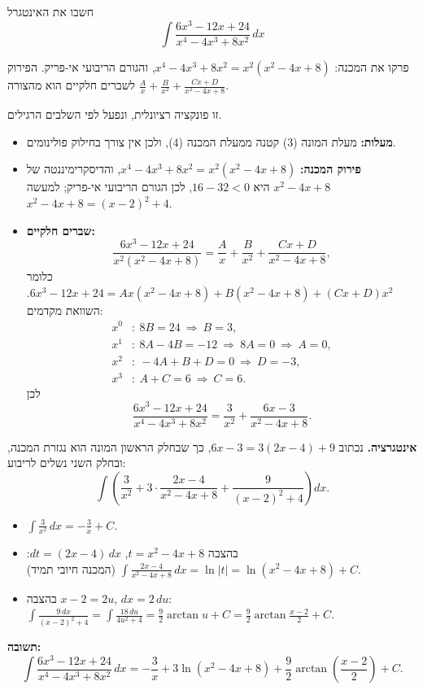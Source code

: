 
\begin{question}
חשבו את האינטגרל
\[ \int \frac{6x^3 - 12x + 24}{x^4 - 4x^3 + 8x^2}\,dx \]
\end{question}

\begin{hint}
פרקו את המכנה: $x^4 - 4x^3 + 8x^2 = x^2(x^2 - 4x + 8)$, והגורם הריבועי אי-פריק. הפירוק לשברים חלקיים הוא מהצורה $\frac{A}{x} + \frac{B}{x^2} + \frac{Cx + D}{x^2 - 4x + 8}$.
\end{hint}

\begin{solution}
זו פונקציה רציונלית, ונפעל לפי השלבים הרגילים.
\begin{itemize}
  \item \textbf{מעלות:} מעלת המונה ($3$) קטנה ממעלת המכנה ($4$), ולכן אין צורך בחילוק פולינומים.
  \item \textbf{פירוק המכנה:} $x^4 - 4x^3 + 8x^2 = x^2(x^2 - 4x + 8)$, והדיסקרימיננטה של $x^2 - 4x + 8$ היא $16 - 32 < 0$, לכן הגורם הריבועי אי-פריק; למעשה $x^2 - 4x + 8 = (x - 2)^2 + 4$.
  \item \textbf{שברים חלקיים:}
  \[ \frac{6x^3 - 12x + 24}{x^2(x^2 - 4x + 8)} = \frac{A}{x} + \frac{B}{x^2} + \frac{Cx + D}{x^2 - 4x + 8}, \]
  כלומר $6x^3 - 12x + 24 = Ax(x^2 - 4x + 8) + B(x^2 - 4x + 8) + (Cx + D)x^2$. השוואת מקדמים:
  \begin{align*}
    x^0 &: \ 8B = 24 \ \Rightarrow\ B = 3, \\
    x^1 &: \ 8A - 4B = -12 \ \Rightarrow\ 8A = 0 \ \Rightarrow\ A = 0, \\
    x^2 &: \ -4A + B + D = 0 \ \Rightarrow\ D = -3, \\
    x^3 &: \ A + C = 6 \ \Rightarrow\ C = 6.
  \end{align*}
  לכן
  \[ \frac{6x^3 - 12x + 24}{x^4 - 4x^3 + 8x^2} = \frac{3}{x^2} + \frac{6x - 3}{x^2 - 4x + 8}. \]
\end{itemize}
\textbf{אינטגרציה.} נכתוב $6x - 3 = 3(2x - 4) + 9$, כך שבחלק הראשון המונה הוא נגזרת המכנה, ובחלק השני נשלים לריבוע:
\[ \int \left( \frac{3}{x^2} + 3\cdot\frac{2x - 4}{x^2 - 4x + 8} + \frac{9}{(x - 2)^2 + 4} \right) dx. \]
\begin{itemize}
  \item $\int \frac{3}{x^2}\,dx = -\frac{3}{x} + C$.
  \item בהצבה $t = x^2 - 4x + 8$, $dt = (2x - 4)\,dx$: $\int \frac{2x - 4}{x^2 - 4x + 8}\,dx = \ln|t| = \ln(x^2 - 4x + 8) + C$ (המכנה חיובי תמיד).
  \item בהצבה $x - 2 = 2u$, $dx = 2\,du$: $\int \frac{9\,dx}{(x - 2)^2 + 4} = \int \frac{18\,du}{4u^2 + 4} = \frac92\arctan u + C = \frac92 \arctan\frac{x - 2}{2} + C$.
\end{itemize}
\textbf{תשובה:}
\[ \boxed{\int \frac{6x^3 - 12x + 24}{x^4 - 4x^3 + 8x^2}\,dx = -\frac{3}{x} + 3\ln(x^2 - 4x + 8) + \frac92\arctan\left(\frac{x - 2}{2}\right) + C.} \]
\end{solution}

